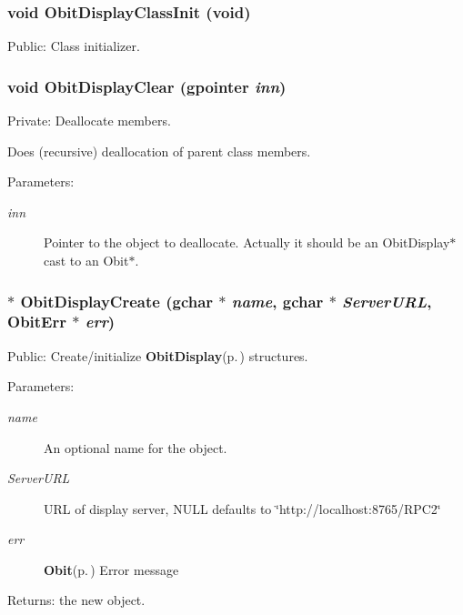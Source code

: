 \subsubsection{\setlength{\rightskip}{0pt plus 5cm}void Obit\-Display\-Class\-Init (void)}\label{ObitDisplay_8c_a18}


Public: Class initializer. 

\subsubsection{\setlength{\rightskip}{0pt plus 5cm}void Obit\-Display\-Clear (gpointer {\em inn})}\label{ObitDisplay_8c_a4}


Private: Deallocate members. 

Does (recursive) deallocation of parent class members. \begin{Desc}
\item[Parameters:]
\begin{description}
\item[{\em inn}]Pointer to the object to deallocate. Actually it should be an Obit\-Display$\ast$ cast to an Obit$\ast$. \end{description}
\end{Desc}
\subsubsection{$\ast$ Obit\-Display\-Create (gchar $\ast$ {\em name}, gchar $\ast$ {\em Server\-URL}, {\bf Obit\-Err} $\ast$ {\em err})}\label{ObitDisplay_8c_a14}


Public: Create/initialize {\bf Obit\-Display}{\rm (p.\,\pageref{structObitDisplay})} structures. 

\begin{Desc}
\item[Parameters:]
\begin{description}
\item[{\em name}]An optional name for the object. \item[{\em Server\-URL}]URL of display server, NULL defaults to \char`\"{}http://localhost:8765/RPC2\char`\"{} \item[{\em err}]{\bf Obit}{\rm (p.\,\pageref{structObit})} Error message \end{description}
\end{Desc}
\begin{Desc}
\item[Returns:]the new object. \end{Desc}
